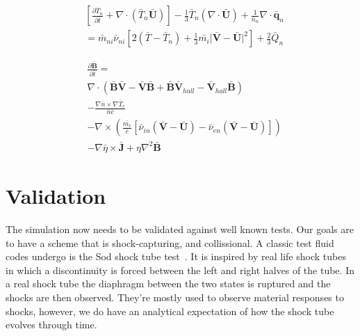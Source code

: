 \documentclass[12pt,upcase]{umlthesis}
\begin{document}
\begin{equation}\label{eq:normtemperatureneutral}
	\begin{aligned}
		&[\frac{\partial\bar{T}_n}{\partial \bar{t}} + \nabla\cdot(\bar{T}_n \bar{\textbf{U}})] - \frac{1}{3}\bar{T}_n (\nabla\cdot\bar{\textbf{U}}) + \frac{1}{\bar{n}_n}\nabla\cdot\bar{\textbf{q}}_n \\
		& = \bar{m}_{ni} \bar{\nu}_{ni} [2(\bar{T} - \bar{T}_n) + \frac{1}{3}\bar{m_i} \lvert \bar{\textbf{V}} - \bar{\textbf{U}} \rvert^2 ] + \frac{2}{3}\bar{Q}_n
	\end{aligned}
\end{equation}

\begin{equation}\label{eq:norminductionequation}
	\begin{aligned}
		& \frac{\partial\bar{\textbf{B}}}{\partial \bar{t}} = \\
		&\nabla\cdot(\bar{\textbf{B}}\bar{\textbf{V}}-\bar{\textbf{V}}\bar{\textbf{B}} + \bar{\textbf{B}}\bar{\textbf{V}}_{hall}-\bar{\textbf{V}}_{hall}\bar{\textbf{B}}) \\
		&-\frac{\nabla \bar{n} \times \nabla \bar{T}_e}{\bar{n}\bar{e}} \\
		&- \nabla\times(\frac{\bar{m_e}}{\bar{e}}[\bar{\nu}_{in} (\bar{\textbf{V}}-\bar{\textbf{U}}) - \bar{\nu}_{en}(\bar{\textbf{V}} - \bar{\textbf{U}})]) \\
		& - \nabla\bar{\eta}\times\bar{\textbf{J}} + \eta\nabla^2\bar{\textbf{B}}
\end{aligned}
\end{equation}


\section{Validation}\label{sec:validation}

The simulation now needs to be validated against well known tests. Our goals are to have a scheme that is shock-capturing, and collissional. A classic test fluid codes undergo is the Sod shock tube test~\citep{Sod1978}. It is inspired by real life shock tubes in which a discontinuity is forced between the left and right halves of the tube. In a real shock tube the diaphragm between the two states is ruptured and the shocks are then observed. They're mostly used to observe material responses to shocks, however, we do have an analytical expectation of how the shock tube evolves through time.
\end{document}

